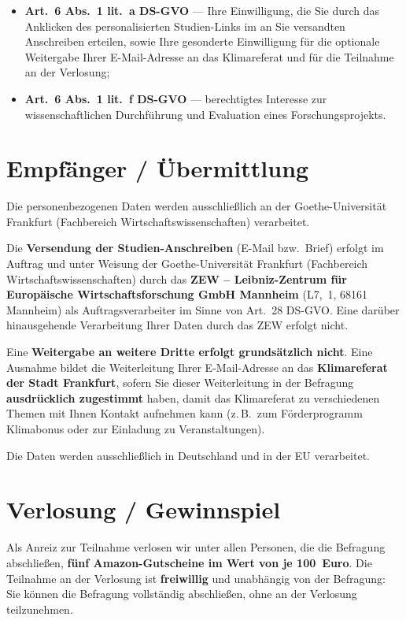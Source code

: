 \documentclass[11pt,a4paper,parskip=half,DIV=12]{scrartcl}
\begin{document}
\begin{itemize}
  \item \textbf{Art.~6 Abs.~1 lit.~a DS-GVO} --- Ihre Einwilligung, die Sie durch das Anklicken des personalisierten Studien-Links im an Sie versandten Anschreiben erteilen, sowie Ihre gesonderte Einwilligung für die optionale Weitergabe Ihrer E-Mail-Adresse an das Klimareferat und für die Teilnahme an der Verlosung;
  \item \textbf{Art.~6 Abs.~1 lit.~f DS-GVO} --- berechtigtes Interesse zur wissenschaftlichen Durchführung und Evaluation eines Forschungs\-projekts.
\end{itemize}

\section*{Empfänger / Übermittlung}

Die personenbezogenen Daten werden ausschließlich an der Goethe-Universität Frankfurt (Fachbereich Wirtschaftswissenschaften) verarbeitet.

Die \textbf{Versendung der Studien-Anschreiben} (E-Mail bzw.\ Brief) erfolgt im Auftrag und unter Weisung der Goethe-Universität Frankfurt (Fachbereich Wirtschaftswissenschaften) durch das \textbf{ZEW -- Leibniz-Zentrum für Europäische Wirtschafts\-forschung GmbH Mannheim} (L7,~1, 68161 Mannheim) als Auftragsverarbeiter im Sinne von Art.~28 DS-GVO. Eine darüber hinausgehende Verarbeitung Ihrer Daten durch das ZEW erfolgt nicht.

Eine \textbf{Weitergabe an weitere Dritte erfolgt grundsätzlich nicht}. Eine Ausnahme bildet die Weiterleitung Ihrer E-Mail-Adresse an das \textbf{Klimareferat der Stadt Frankfurt}, sofern Sie dieser Weiterleitung in der Befragung \textbf{ausdrücklich zugestimmt} haben, damit das Klimareferat zu verschiedenen Themen mit Ihnen Kontakt aufnehmen kann (z.\,B.\ zum Förderprogramm Klimabonus oder zur Einladung zu Veranstaltungen).

Die Daten werden ausschließlich in Deutschland und in der EU verarbeitet.

\section*{Verlosung / Gewinnspiel}

Als Anreiz zur Teilnahme verlosen wir unter allen Personen, die die Befragung abschließen, \textbf{fünf Amazon-Gutscheine im Wert von je 100~Euro}. Die Teilnahme an der Verlosung ist \textbf{freiwillig} und unabhängig von der Befragung: Sie können die Befragung vollständig abschließen, ohne an der Verlosung teilzunehmen.
\end{document}
